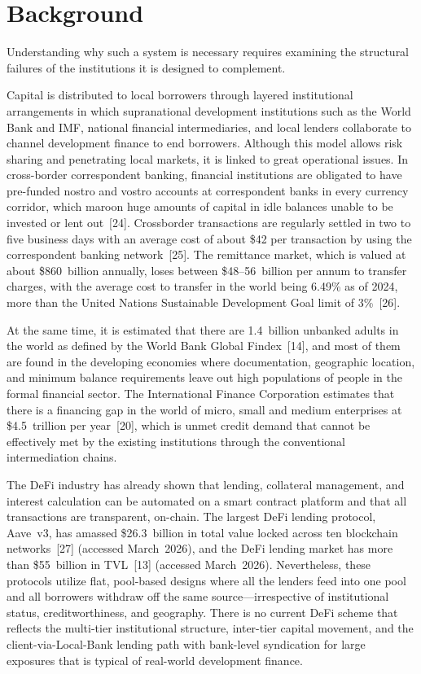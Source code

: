 \documentclass[12pt,a4paper]{report}
\begin{document}
\section{Background}

Understanding why such a system is necessary requires examining the structural failures of the institutions it is designed to complement.

Capital is distributed to local borrowers through layered institutional arrangements in which supranational development institutions such as the World Bank and IMF, national financial intermediaries, and local lenders collaborate to channel development finance to end borrowers. Although this model allows risk sharing and penetrating local markets, it is linked to great operational issues. In cross-border correspondent banking, financial institutions are obligated to have pre-funded nostro and vostro accounts at correspondent banks in every currency corridor, which maroon huge amounts of capital in idle balances unable to be invested or lent out~[24]. Crossborder transactions are regularly settled in two to five business days with an average cost of about \$42 per transaction by using the correspondent banking network~[25]. The remittance market, which is valued at about \$860~billion annually, loses between \$48--56~billion per annum to transfer charges, with the average cost to transfer in the world being 6.49\% as of 2024, more than the United Nations Sustainable Development Goal limit of 3\%~[26].

At the same time, it is estimated that there are 1.4~billion unbanked adults in the world as defined by the World Bank Global Findex~[14], and most of them are found in the developing economies where documentation, geographic location, and minimum balance requirements leave out high populations of people in the formal financial sector. The International Finance Corporation estimates that there is a financing gap in the world of micro, small and medium enterprises at \$4.5~trillion per year~[20], which is unmet credit demand that cannot be effectively met by the existing institutions through the conventional intermediation chains.

The DeFi industry has already shown that lending, collateral management, and interest calculation can be automated on a smart contract platform and that all transactions are transparent, on-chain. The largest DeFi lending protocol, Aave~v3, has amassed \$26.3~billion in total value locked across ten blockchain networks~[27] (accessed March~2026), and the DeFi lending market has more than \$55~billion in TVL~[13] (accessed March~2026). Nevertheless, these protocols utilize flat, pool-based designs where all the lenders feed into one pool and all borrowers withdraw off the same source---irrespective of institutional status, creditworthiness, and geography. There is no current DeFi scheme that reflects the multi-tier institutional structure, inter-tier capital movement, and the client-via-Local-Bank lending path with bank-level syndication for large exposures that is typical of real-world development finance.
\end{document}
